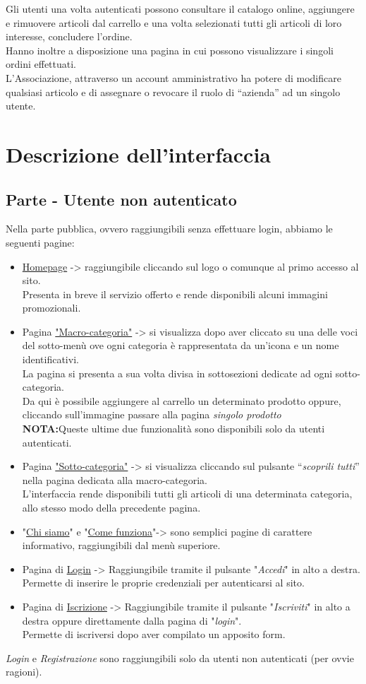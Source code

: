 Gli utenti una volta autenticati possono consultare il catalogo online, aggiungere e rimuovere articoli dal carrello e una volta selezionati tutti gli articoli di loro interesse, concludere l’ordine. \\
Hanno inoltre a disposizione una pagina in cui possono visualizzare i singoli ordini effettuati.\\

L’Associazione, attraverso un account amministrativo ha potere di modificare qualsiasi articolo e di assegnare o revocare il ruolo di “azienda” ad un singolo utente. 
\newpage
\section{Descrizione dell'interfaccia}
\subsection{Parte - Utente non autenticato}
Nella parte pubblica, ovvero raggiungibili senza effettuare login, abbiamo le seguenti pagine:
\begin{itemize}
	\item \underline{Homepage} -> raggiungibile cliccando sul logo o comunque al primo accesso al sito.\\ Presenta in breve il servizio offerto e rende disponibili alcuni immagini promozionali.
	\item Pagina \underline{"Macro-categoria"} -> si visualizza dopo aver cliccato su una delle voci del sotto-menù ove ogni categoria è rappresentata da un’icona e un nome identificativi.\\ La pagina si presenta a sua volta divisa in sottosezioni dedicate ad ogni sotto-categoria.\\
	Da qui è possibile aggiungere al carrello un determinato prodotto oppure, cliccando sull'immagine passare alla pagina \textit{singolo prodotto}\\ \textbf{NOTA:}Queste ultime due funzionalità sono disponibili solo da utenti autenticati.
	\item Pagina \underline{"Sotto-categoria"} -> si visualizza cliccando sul pulsante “\textit{scoprili tutti}” nella pagina dedicata alla macro-categoria.\\L’interfaccia rende disponibili tutti gli articoli di una determinata categoria, allo stesso modo della precedente pagina.
	\item "\underline{Chi siamo}"  e "\underline{Come funziona}"-> sono semplici pagine di carattere informativo, raggiungibili dal menù superiore.
	\item Pagina di \underline{Login} -> Raggiungibile tramite il pulsante "\textit{Accedi}" in alto a destra.\\
	Permette di inserire le proprie credenziali per autenticarsi al sito.
	\item Pagina di \underline{Iscrizione} -> Raggiungibile tramite il pulsante "\textit{Iscriviti}" in alto a destra oppure direttamente dalla pagina di "\textit{login}".\\
	Permette di iscriversi dopo aver compilato un apposito form.
\end{itemize}
\textit{Login} e \textit{Registrazione} sono raggiungibili solo da utenti non autenticati (per ovvie ragioni).
